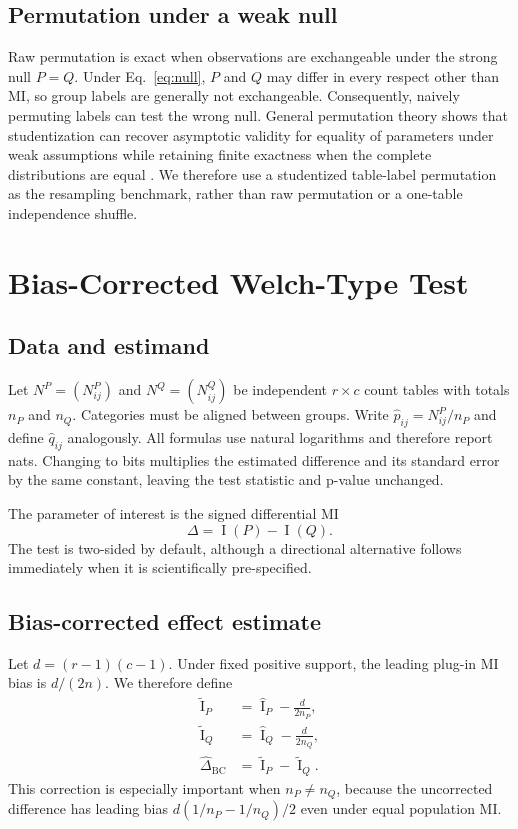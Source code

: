 \documentclass[10pt,twocolumn]{article}
\newcommand{\MI}{\operatorname{I}}
\begin{document}
\subsection{Permutation under a weak null}

Raw permutation is exact when observations are exchangeable under the strong
null \(P=Q\). Under Eq.~\eqref{eq:null}, \(P\) and \(Q\) may differ in every
respect other than MI, so group labels are generally not exchangeable.
Consequently, naively permuting labels can test the wrong null. General
permutation theory shows that studentization can recover asymptotic validity
for equality of parameters under weak assumptions while retaining finite
exactness when the complete distributions are equal \citep{chung2013}. We
therefore use a studentized table-label permutation as the resampling
benchmark, rather than raw permutation or a one-table independence shuffle.

\section{Bias-Corrected Welch-Type Test}

\subsection{Data and estimand}

Let \(N^P=(N^P_{ij})\) and \(N^Q=(N^Q_{ij})\) be independent \(r\times c\)
count tables with totals \(n_P\) and \(n_Q\). Categories must be aligned
between groups. Write \(\widehat p_{ij}=N^P_{ij}/n_P\) and define
\(\widehat q_{ij}\) analogously. All formulas use natural logarithms and
therefore report nats. Changing to bits multiplies the estimated difference
and its standard error by the same constant, leaving the test statistic and
p-value unchanged.

The parameter of interest is the signed differential MI
\begin{equation}
  \Delta=\MI(P)-\MI(Q).
\end{equation}
The test is two-sided by default, although a directional alternative follows
immediately when it is scientifically pre-specified.

\subsection{Bias-corrected effect estimate}

Let \(d=(r-1)(c-1)\). Under fixed positive support, the leading plug-in MI
bias is \(d/(2n)\). We therefore define
\begin{align}
  \widetilde{\MI}_P
    &= \widehat{\MI}_P-\frac{d}{2n_P},\\
  \widetilde{\MI}_Q
    &= \widehat{\MI}_Q-\frac{d}{2n_Q},\\
  \widehat\Delta_{\mathrm{BC}}
    &=\widetilde{\MI}_P-\widetilde{\MI}_Q.
  \label{eq:delta}
\end{align}
This correction is especially important when \(n_P\ne n_Q\), because the
uncorrected difference has leading bias
\(d(1/n_P-1/n_Q)/2\) even under equal population MI.
\end{document}
